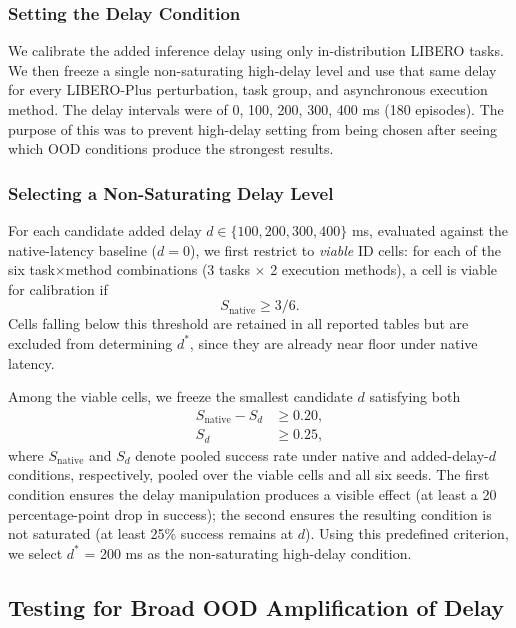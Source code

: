 \documentclass{article}
\begin{document}
\subsubsection{Setting the Delay Condition}

We calibrate the added inference delay using only in-distribution LIBERO tasks. We then freeze a single non-saturating high-delay level and use that same delay for every LIBERO-Plus perturbation, task group, and asynchronous execution method.
 The delay intervals were of 0, 100, 200, 300, 400 ms (180 episodes).
The purpose of this was to prevent high-delay setting from being chosen after seeing which OOD conditions produce the strongest results.

\subsubsection{Selecting a Non-Saturating Delay Level}

For each candidate added delay $d \in \{100, 200, 300, 400\}$ ms, evaluated
against the native-latency baseline ($d = 0$), we first restrict to
\emph{viable} ID cells: for each of the six task$\times$method combinations
(3 tasks $\times$ 2 execution methods), a cell is viable for calibration if
\begin{equation}
    S_{\text{native}} \geq 3/6.
\end{equation}
Cells falling below this threshold are retained in all reported tables but
are excluded from determining $d^*$, since they are already near floor under
native latency.

Among the viable cells, we freeze the smallest candidate $d$ satisfying both
\begin{align}
    S_{\text{native}} - S_d &\geq 0.20, \\
    S_d &\geq 0.25,
\end{align}
where $S_{\text{native}}$ and $S_d$ denote pooled success rate under native
and added-delay-$d$ conditions, respectively, pooled over the viable cells
and all six seeds. The first condition ensures the delay manipulation
produces a visible effect (at least a 20 percentage-point drop in success);
the second ensures the resulting condition is not saturated (at least 25\%
success remains at $d$).
Using this predefined criterion, we select $d^*$ = 200 ms as the non-saturating high-delay condition.

\subsection{Testing for Broad OOD Amplification of Delay}
\end{document}
